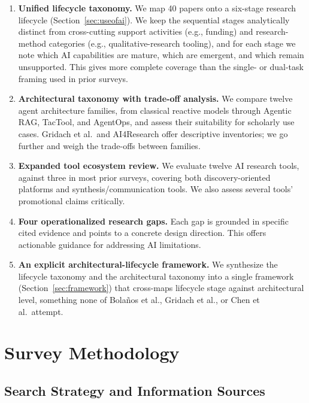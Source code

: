 \documentclass[sn-basic,Numbered]{sn-jnl}
\begin{document}
\begin{enumerate}
  \item \textbf{Unified lifecycle taxonomy.} We map 40 papers onto a six-stage research lifecycle (Section~\ref{sec:useofai}). We keep the sequential stages analytically distinct from cross-cutting support activities (e.g., funding) and research-method categories (e.g., qualitative-research tooling), and for each stage we note which AI capabilities are mature, which are emergent, and which remain unsupported. This gives more complete coverage than the single- or dual-task framing used in prior surveys.

  \item \textbf{Architectural taxonomy with trade-off analysis.} We compare twelve agent architecture families, from classical reactive models through Agentic RAG, TacTool, and AgentOps, and assess their suitability for scholarly use cases. Gridach et al.\ and AI4Research offer descriptive inventories; we go further and weigh the trade-offs between families.
\item \textbf{Expanded tool ecosystem review.} We evaluate twelve AI research tools, against three in most prior surveys, covering both discovery-oriented platforms and synthesis/communication tools. We also assess several tools' promotional claims critically.

  \item \textbf{Four operationalized research gaps.} Each gap is
  grounded in specific cited evidence and points to a concrete design
  direction. This offers actionable guidance for addressing AI limitations.

  \item \textbf{An explicit architectural-lifecycle framework.} We
  synthesize the lifecycle taxonomy and the architectural taxonomy
  into a single framework (Section~\ref{sec:framework}) that
  cross-maps lifecycle stage against architectural level, something
  none of Bola\~nos et al., Gridach et al., or Chen et al.\ attempt.
\end{enumerate}

\section{Survey Methodology}
\label{sec:methodology}

\subsection{Search Strategy and Information Sources}
\end{document}
